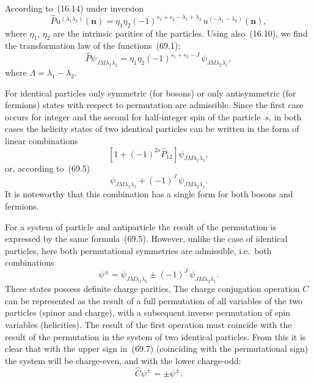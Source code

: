 According to~(16.14) under inversion
\begin{equation}
\hat{P}u^{(\lambda_1\lambda_2)}(\mathbf{n}) = \eta_1\eta_2(-1)^{s_1 + s_2 - \lambda_1 + \lambda_2}\,u^{(-\lambda_1 - \lambda_2)}(\mathbf{n}),
\tag{69.3}
\end{equation}
where $\eta_1$, $\eta_2$ are the intrinsic parities of the particles. Using also~(16.10), we find the transformation law of the functions~(69.1):
\begin{equation}
\hat{P}\psi_{JM\lambda_1\lambda_2} = \eta_1\eta_2(-1)^{s_1 + s_2 - J}\,\psi_{JM\lambda_2\lambda_1},
\tag{69.4}
\end{equation}
where $\Lambda = \lambda_1 - \lambda_2$.

For identical particles only symmetric (for bosons) or only antisymmetric (for fermions) states with respect to permutation are admissible. Since the first case occurs for integer and the second for half-integer spin of the particle~$s$, in both cases the helicity states of two identical particles can be written in the form of linear combinations
\[
[1 + (-1)^{2s}\hat{P}_{12}]\psi_{JM\lambda_1\lambda_2},
\]
or, according to~(69.5)
\begin{equation}
\psi_{JM\lambda_1\lambda_2} + (-1)^J\,\psi_{JM\lambda_2\lambda_1}.
\tag{69.6}
\end{equation}
It is noteworthy that this combination has a single form for both bosons and fermions.

For a system of particle and antiparticle the result of the permutation is expressed by the same formula~(69.5). However, unlike the case of identical particles, here both permutational symmetries are admissible, i.e.\ both combinations
\begin{equation}
\psi^\pm = \psi_{JM\lambda_1\lambda_2} \pm (-1)^J\,\psi_{JM\lambda_2\lambda_1}.
\tag{69.7}
\end{equation}
These states possess definite charge parities. The charge conjugation operation $C$ can be represented as the result of a full permutation of all variables of the two particles (spinor and charge), with a subsequent inverse permutation of spin variables (helicities). The result of the first operation must coincide with the result of the permutation in the system of two identical particles. From this it is clear that with the upper sign in~(69.7) (coinciding with the permutational sign) the system will be charge-even, and with the lower charge-odd:
\[
\hat{C}\psi^\pm = \pm\psi^\pm.
\]

